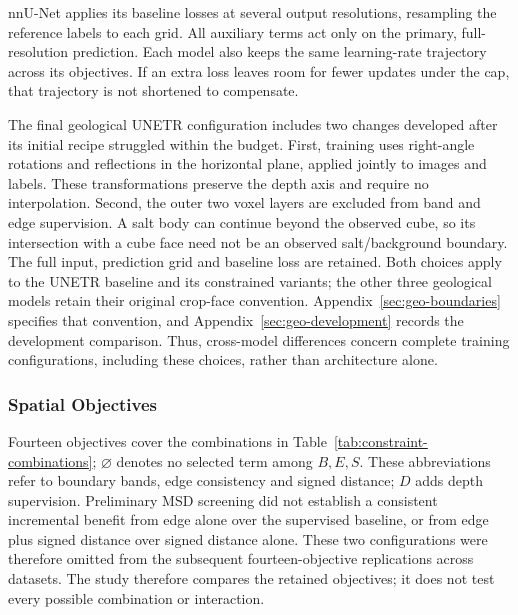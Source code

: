 nnU-Net applies its baseline losses at several output resolutions,
resampling the reference labels to each grid. All auxiliary terms act
only on the primary, full-resolution prediction. Each model also keeps
the same learning-rate trajectory across its objectives. If an extra
loss leaves room for fewer updates under the cap, that trajectory is
not shortened to compensate.

The final geological UNETR configuration includes two changes developed
after its initial recipe struggled within the budget. First, training
uses right-angle rotations and reflections in the horizontal plane,
applied jointly to images and labels. These transformations preserve
the depth axis and require no interpolation. Second, the outer two
voxel layers are excluded from band and edge supervision. A salt body
can continue beyond the observed cube, so its intersection with a cube
face need not be an observed salt/background boundary. The full input,
prediction grid and baseline loss are retained. Both choices apply to
the UNETR baseline and its constrained variants; the other three
geological models retain their original crop-face convention.
Appendix~\ref{sec:geo-boundaries} specifies that convention, and
Appendix~\ref{sec:geo-development} records the development comparison.
Thus, cross-model differences concern complete training configurations,
including these choices, rather than architecture alone.

\subsubsection{Spatial Objectives}

Fourteen objectives cover the combinations in
Table~\ref{tab:constraint-combinations}; $\varnothing$ denotes no
selected term among $B,E,S$. These abbreviations refer to boundary
bands, edge consistency and signed distance; $D$ adds depth supervision.
Preliminary MSD screening did not establish a consistent incremental
benefit from edge alone over the supervised baseline, or from edge plus
signed distance over signed distance alone. These two
configurations were therefore omitted from the subsequent
fourteen-objective replications across datasets. The study therefore
compares the retained objectives; it does not test every possible
combination or interaction.

